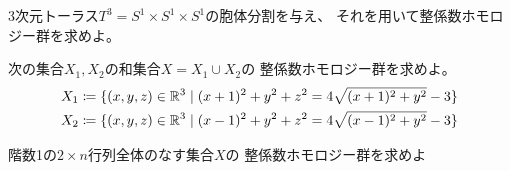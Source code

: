 \documentclass[report]{jlreq}
\begin{document}
\begin{problem}
    3次元トーラス$T^3 = S^1 \times S^1 \times S^1$の胞体分割を与え、
    それを用いて整係数ホモロジー群を求めよ。
\end{problem}

\begin{answer}
    \TODO{}
\end{answer}

\begin{problem}
    次の集合$X_1, X_2$の和集合$X = X_1 \cup X_2$の
    整係数ホモロジー群を求めよ。
    \begin{alignat}{1}
        X_1 &\coloneqq \{
            (x, y, z) \in \mathbb{R}^3 \mid
            (x + 1)^2 + y^2 + z^2 = 4 \sqrt{(x + 1)^2 + y^2} - 3
        \} \\
        X_2 &\coloneqq \{
            (x, y, z) \in \mathbb{R}^3 \mid
            (x - 1)^2 + y^2 + z^2 = 4 \sqrt{(x - 1)^2 + y^2} - 3
        \}
    \end{alignat}
\end{problem}

\begin{answer}
    \TODO{}
\end{answer}

\begin{problem}
    階数1の$2 \times n$行列全体のなす集合$X$の
    整係数ホモロジー群を求めよ
\end{problem}

\begin{answer}
    \TODO{}
\end{answer}
\end{document}
